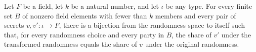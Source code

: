 \begin{theorem}
\label{TCSlib.Shamir.vecScheme_perfectPrivacy}
\leanok
{}
Let $F$ be a field, let $k$ be a natural number, and let $\iota$ be any type. For every
finite set $B$ of nonzero field elements with fewer than $k$ members and every pair of
secrets $v,v':\iota\to F$, there is a bijection from the randomness space to itself such
that, for every randomness choice and every party in $B$, the share of $v'$ under the
transformed randomness equals the share of $v$ under the original randomness.
\end{theorem}
